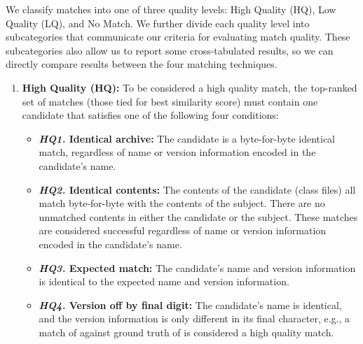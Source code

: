\vspace{0.7em}

\noindent We classify matches into one of three quality levels: High
Quality (HQ), Low Quality (LQ), and No Match.  We further divide each
quality level into subcategories that communicate our criteria for
evaluating match quality.  These subcategories also allow us to report some
cross-tabulated results, so we can directly compare results between the
four matching techniques.


\begin{enumerate}
    \item \textbf{High Quality (HQ):}
    To be considered a high quality match, the top-ranked set of matches
    (those tied for best similarity score) must contain one candidate that
    satisfies one of the following four conditions:

    \begin{itemize}

        \vspace{0.7em}
        \item \textbf{\emph{HQ1.} Identical archive:}
        The candidate is a byte-for-byte identical match, regardless of name or
        version information encoded in the candidate's name.

        \vspace{0.7em}
        \item \textbf{\emph{HQ2.} Identical contents:}
        The contents of the candidate (class files) all match byte-for-byte
        with the contents of the subject.  There are no unmatched contents in
        either the candidate or the subject.  These matches are considered
        successful regardless of name or version information encoded in the
        candidate's name.

        \vspace{0.7em}
        \item \textbf{\emph{HQ3.} Expected match:}
        The candidate's name and version information is identical to the
        expected name and version information.

        \vspace{0.7em}
        \item \textbf{\emph{HQ4.} Version off by final digit:}
        The candidate's name is identical, and the version information is only
        different in its final character, e.g., a match of
         against ground truth of
         is considered a high quality match.


\end{itemize}
\end{enumerate}
